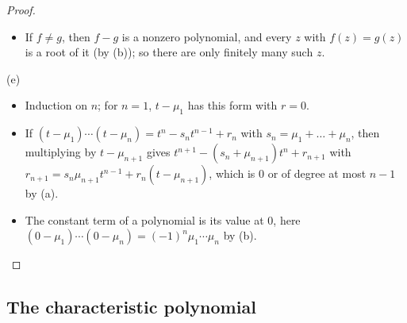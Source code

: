 \documentclass[12pt]{article}
\theoremstyle{definition}
\begin{document}
\begin{proof}
\begin{itemize}
\(m-1\) roots, so \(f\) has at most \(m\).
\item If \(f\ne g\), then \(f-g\) is a nonzero polynomial, and every \(z\) with \(f(z)=g(z)\) is a root of it (by (b)); so
there are only finitely many such \(z\).
\end{itemize}
(e)
\begin{itemize}
\item Induction on \(n\); for \(n=1\), \(t-\mu_1\) has this form with \(r=0\).
\item If \((t-\mu_1)\cdots(t-\mu_n)=t^n-s_nt^{n-1}+r_n\) with \(s_n=\mu_1+\dots+\mu_n\), then multiplying by \(t-\mu_{n+1}\)
gives \(t^{n+1}-(s_n+\mu_{n+1})t^n+r_{n+1}\) with \(r_{n+1}=s_n\mu_{n+1}t^{n-1}+r_n(t-\mu_{n+1})\), which is \(0\) or of
degree at most \(n-1\) by (a).
\item The constant term of a polynomial is its value at \(0\), here \((0-\mu_1)\cdots(0-\mu_n)=(-1)^n\mu_1\cdots\mu_n\) by
(b).\qedhere
\end{itemize}
\end{proof}

\subsection*{The characteristic polynomial}
\end{document}
